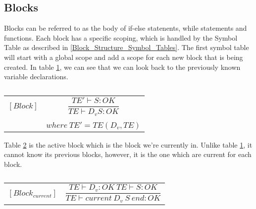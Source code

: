 \subsection{Blocks}
Blocks can be referred to as the body of if-else statenents, while statements and functions. Each block has a specific scoping, which is handled by the Symbol Table as described in \ref{Block_Structure_Symbol_Tables}. The first symbol table will start with a global scope and add a scope for each new block that is being created. In table \ref{block}, we can see that we can look back to the previously known variable declarations.
\begin{table}[H]
    \begin{center}
    \begin{longtable}[c] { r c }
        $[Block]$ 
        & 
        \( \dfrac{TE' \vdash S : OK} 
        {TE \vdash D_v S : OK} \) 
        \\ \\
        & 
        \( {where \ TE' = TE(D_v, TE)} \)
    \end{longtable}
    \caption{}\label{block}
        \end{center}
\end{table}

Table \ref{active-block} is the active block which is the block we’re currently in. Unlike table \ref{block}, it cannot know its previous blocks, however, it is the one which are current for each block.
\begin{table}[H]
    \begin{center}
    \begin{longtable}[c] { r c }
        $[Block_{current}]$ 
        & 
        \( \dfrac{TE \vdash D_{v} : OK \ TE \vdash S : OK} 
        {TE \vdash current \ D_{v} \ S \ end  :  OK} \)
    \end{longtable}
    \caption{}\label{active-block}
        \end{center}
\end{table}
